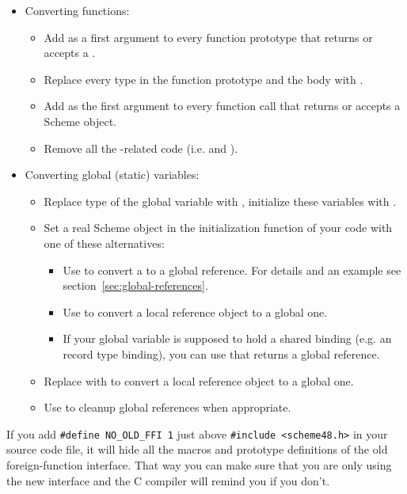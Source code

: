 \begin{itemize}
\item Converting functions:
  \begin{itemize}
  \item Add  as a first argument to every
    function prototype that returns or accepts a .

  \item Replace every  type in the function prototype
    and the body with .

  \item Add  as the first argument to every function call
    that returns or accepts a Scheme object.

  \item Remove all the -related code (i.e.
     and ).
  \end{itemize}

\item Converting global (static) variables:
  \begin{itemize}
  \item Replace  type of the global variable with
    , initialize these variables with .

  \item Set a real Scheme object in the initialization function of
    your code with one of these alternatives:
    \begin{itemize}
    \item Use  to convert a
       to a global reference.  For details and an
      example see section~\ref{sec:global-references}.

    \item Use  to convert a local
      reference object to a global one.

    \item If your global variable is supposed to hold a shared binding
      (e.g. an record type binding), you can use
       that returns a global
      reference.
    \end{itemize}
  
  \item Replace  with
     to convert a local reference
    object to a global one.
  
  \item Use  to cleanup global references
    when appropriate.
  \end{itemize}
\end{itemize}

\noindent{}If you add \verb|#define NO_OLD_FFI 1| just above
\verb|#include <scheme48.h>| in your source code file, it will hide all
the macros and prototype definitions of the old foreign-function
interface.  That way you can make sure that you are only using the new
interface and the C compiler will remind you if you don't.

